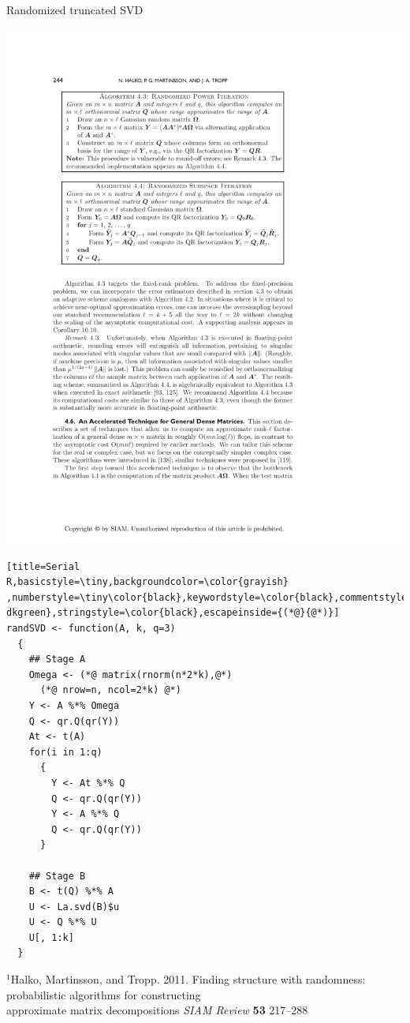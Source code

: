 \begin{frame}[fragile]
\begin{block}{Randomized truncated SVD\footnotemark}
\begin{minipage}{.56\textwidth}
\begin{center}
      \includegraphics[height=.26\textheight]{../common/pics/randsvd/randSVDalg4_4}
    \end{center}
  \end{minipage}
  \begin{minipage}{0.43\textwidth}
\begin{lstlisting}[title=Serial 
R,basicstyle=\tiny,backgroundcolor=\color{grayish} 
,numberstyle=\tiny\color{black},keywordstyle=\color{black},commentstyle=\color{ 
dkgreen},stringstyle=\color{black},escapeinside={(*@}{@*)}]
randSVD <- function(A, k, q=3)
  {
    ## Stage A
    Omega <- (*@ matrix(rnorm(n*2*k),@*)
      (*@ nrow=n, ncol=2*k) @*)
    Y <- A %*% Omega
    Q <- qr.Q(qr(Y))
    At <- t(A)
    for(i in 1:q)
      {
        Y <- At %*% Q
        Q <- qr.Q(qr(Y))
        Y <- A %*% Q
        Q <- qr.Q(qr(Y))
      }
    
    ## Stage B
    B <- t(Q) %*% A
    U <- La.svd(B)$u
    U <- Q %*% U
    U[, 1:k]
  }
\end{lstlisting} %
\end{minipage}
{\fontsize{6pt}{10}\selectfont $^1$Halko, Martinsson, 
  and Tropp. 2011. Finding structure with randomness: probabilistic
  algorithms  for constructing \\[-1ex] approximate matrix decompositions
  \emph{SIAM Review} \textbf{53} 217--288}
\end{block}
\end{frame}


